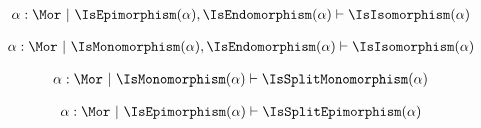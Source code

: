 \begin{sequent}
\begin{align*}
  \alpha:\Mor ~|~ \IsEpimorphism( \alpha ), \IsEndomorphism( \alpha ) \vdash \IsIsomorphism( \alpha )
\end{align*}
\end{sequent}

\begin{sequent}
\begin{align*}
  \alpha:\Mor ~|~ \IsMonomorphism( \alpha ), \IsEndomorphism( \alpha ) \vdash \IsIsomorphism( \alpha )
\end{align*}
\end{sequent}

\begin{sequent}
\begin{align*}
  \alpha:\Mor ~|~ \IsMonomorphism( \alpha ) \vdash \IsSplitMonomorphism( \alpha )
\end{align*}
\end{sequent}

\begin{sequent}
\begin{align*}
  \alpha:\Mor ~|~ \IsEpimorphism( \alpha ) \vdash \IsSplitEpimorphism( \alpha )
\end{align*}
\end{sequent}
